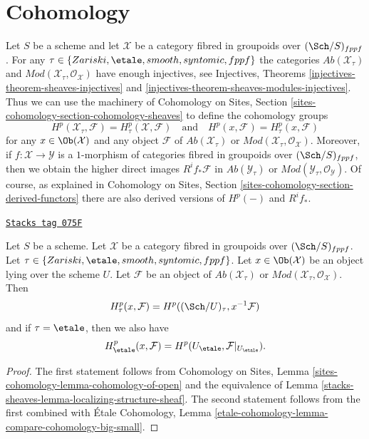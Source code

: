 \section{Cohomology}
\label{stacks-sheaves-section-cohomology-general}
Let $S$ be a scheme and let $\mathcal{X}$ be a category fibred in groupoids
over $(\Sch/S)_{fppf}$. For any $\tau \in \{Zariski, \etale, smooth,
syntomic, fppf\}$ the categories $\textit{Ab}(\mathcal{X}_\tau)$ and
$\textit{Mod}(\mathcal{X}_\tau, \mathcal{O}_\mathcal{X})$ have
enough injectives, see
Injectives, Theorems \ref{injectives-theorem-sheaves-injectives} and
\ref{injectives-theorem-sheaves-modules-injectives}.
Thus we can use the machinery of
Cohomology on Sites, Section \ref{sites-cohomology-section-cohomology-sheaves}
to define the cohomology groups
$$
H^p(\mathcal{X}_\tau, \mathcal{F}) = H^p_\tau(\mathcal{X}, \mathcal{F})
\quad\text{and}\quad
H^p(x, \mathcal{F}) = H^p_\tau(x, \mathcal{F})
$$
for any $x \in \Ob(\mathcal{X})$ and any object $\mathcal{F}$ of
$\textit{Ab}(\mathcal{X}_\tau)$ or
$\textit{Mod}(\mathcal{X}_\tau, \mathcal{O}_\mathcal{X})$. Moreover, if
$f : \mathcal{X} \to \mathcal{Y}$ is a $1$-morphism of categories fibred
in groupoids over $(\Sch/S)_{fppf}$, then we obtain the higher direct
images $R^if_*\mathcal{F}$ in $\textit{Ab}(\mathcal{Y}_\tau)$ or
$\textit{Mod}(\mathcal{Y}_\tau, \mathcal{O}_\mathcal{Y})$.
Of course, as explained in
Cohomology on Sites, Section \ref{sites-cohomology-section-derived-functors}
there are also derived versions of $H^p(-)$ and $R^if_*$.

\begin{lemma}
\label{stacks-sheaves-lemma-cohomology-restriction}
\href{https://stacks.math.columbia.edu/tag/075F}{\texttt{Stacks tag 075F}}

Let $S$ be a scheme. Let $\mathcal{X}$ be a category fibred in groupoids
over $(\Sch/S)_{fppf}$. Let $\tau \in \{Zariski, \etale, smooth,
syntomic, fppf\}$. Let $x \in \Ob(\mathcal{X})$ be an object lying
over the scheme $U$. Let $\mathcal{F}$ be
an object of $\textit{Ab}(\mathcal{X}_\tau)$ or
$\textit{Mod}(\mathcal{X}_\tau, \mathcal{O}_\mathcal{X})$. Then
$$
H^p_\tau(x, \mathcal{F}) = H^p((\Sch/U)_\tau, x^{-1}\mathcal{F})
$$
and if $\tau = \etale$, then we also have
$$
H^p_\etale(x, \mathcal{F}) =
H^p(U_\etale, \mathcal{F}|_{U_\etale}).
$$
\end{lemma}

\begin{proof}
The first statement follows from
Cohomology on Sites, Lemma \ref{sites-cohomology-lemma-cohomology-of-open}
and the equivalence of
Lemma \ref{stacks-sheaves-lemma-localizing-structure-sheaf}.
The second statement follows from the first combined with
\'Etale Cohomology, Lemma
\ref{etale-cohomology-lemma-compare-cohomology-big-small}.
\end{proof}

